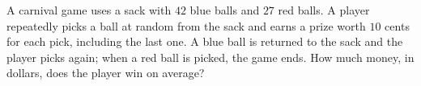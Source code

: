 A carnival game uses a sack with $42$ blue balls and $27$ red balls. A player repeatedly picks a ball at random from the sack and earns a prize worth $10$ cents for each pick, including the last one. A blue ball is returned to the sack and the player picks again; when a red ball is picked, the game ends. How much money, in dollars, does the player win on average?
